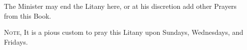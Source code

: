 \begin{rubric}
	The Minister may end the Litany here, or at his discretion add other Prayers from this Book.
\end{rubric}
\begin{rubric}
	\textsc{Note,} It is a pious custom to pray this Litany upon Sundays, Wednesdays, and Fridays.
\end{rubric}

